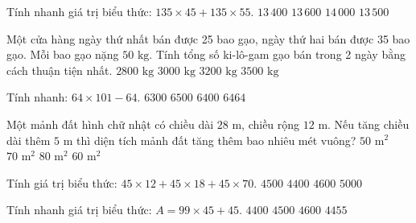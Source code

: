 \begin{ex} %
Tính nhanh giá trị biểu thức: $135 \times 45 + 135 \times 55$.
\choice
{$13\,400$}
{$13\,600$}
{$14\,000$}
{\True $13\,500$}
\end{ex}

\begin{ex} %
Một cửa hàng ngày thứ nhất bán được 25 bao gạo, ngày thứ hai bán được 35 bao gạo. Mỗi bao gạo nặng $50\text{ kg}$. Tính tổng số ki-lô-gam gạo bán trong 2 ngày bằng cách thuận tiện nhất.
\choice
{$2800\text{ kg}$}
{\True $3000\text{ kg}$}
{$3200\text{ kg}$}
{$3500\text{ kg}$}
\end{ex}

\begin{ex} %
Tính nhanh: $64 \times 101 - 64$.
\choice
{$6300$}
{$6500$}
{\True $6400$}
{$6464$}
\end{ex}

\begin{ex} %
Một mảnh đất hình chữ nhật có chiều dài $28\text{ m}$, chiều rộng $12\text{ m}$. Nếu tăng chiều dài thêm $5\text{ m}$ thì diện tích mảnh đất tăng thêm bao nhiêu mét vuông?
\choice
{$50\text{ m}^2$}
{$70\text{ m}^2$}
{$80\text{ m}^2$}
{\True $60\text{ m}^2$}
\end{ex}

\begin{ex} %
Tính giá trị biểu thức: $45 \times 12 + 45 \times 18 + 45 \times 70$.
\choice
{\True $4500$}
{$4400$}
{$4600$}
{$5000$}
\end{ex}

\begin{ex} %
Tính nhanh giá trị biểu thức: $A = 99 \times 45 + 45$.
\choice
{$4400$}
{\True $4500$}
{$4600$}
{$4455$}
\end{ex}

